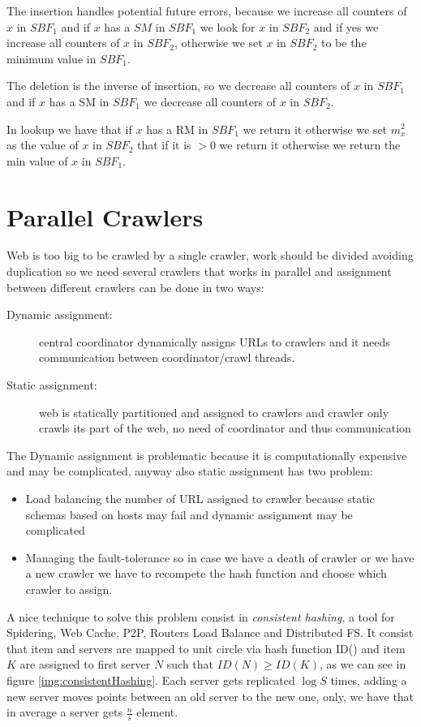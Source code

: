     The insertion handles potential future errors, because we increase all counters of $x$ in $SBF_1$ and if $x$ has a $SM$ in $SBF_1$ we look for $x$ in $SBF_2$ and 
    if yes we increase all counters of $x$ in $SBF_2$, otherwise we set $x$ in $SBF_2$ to be the minimum value in $SBF_1$.

    The deletion is the inverse of insertion, so we decrease all counters of $x$ in $SBF_1$ and if $x$ has a SM in $SBF_1$ we decrease all counters of $x$ in $SBF_2$.

    In lookup we have that if $x$ has a RM in $SBF_1$ we return it otherwise we set $m_x^2$ as the value of $x$ in $SBF_2$ that if it is $> 0$ we return it otherwise we return the min value of $x$ in $SBF_1$.


\section{Parallel Crawlers}
    Web is too big to be crawled by a single crawler, work should be divided avoiding duplication so we need several crawlers that works in parallel and assignment 
    between different crawlers can be done in two ways:
    \begin{description}
	    \item [Dynamic assignment: ] central coordinator dynamically assigns URLs to crawlers and it needs communication between coordinator/crawl threads.
	    \item [Static assignment: ] web is statically partitioned and assigned to crawlers and crawler only crawls its part of the web, no need of coordinator and thus communication
    \end{description}
    The Dynamic assignment is problematic because it is computationally expensive and may be complicated, anyway also static assignment has two problem:
    \begin{itemize}
	\item Load balancing the number of URL assigned to crawler because static schemas based on hosts may fail and dynamic assignment may be complicated
	\item Managing the fault-tolerance so in case we have a death of crawler or we have a new crawler we have to recompete the hash function and choose which crawler to assign.
    \end{itemize}
    A nice technique to solve this problem consist in \emph{consistent hashing}, a tool for Spidering, Web Cache, P2P, Routers Load Balance and Distributed FS.\newline
    It consist that item and servers are mapped to unit circle via hash function ID() and item $K$ are assigned to first server $N$ such that $ID(N) \geq ID(K)$, as we can 
    see in figure \ref{img:consistentHashing}.\newline
    Each server gets replicated $\log S$ times, adding a new server moves points between an old server to the new one, only, we have that in average a server gets $\frac{n}{s}$ element.

